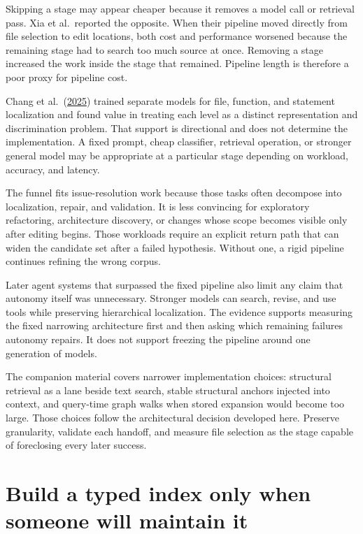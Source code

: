 Skipping a stage may appear cheaper because it removes a model call or retrieval pass. Xia et al.~reported the opposite. When their pipeline moved directly from file selection to edit locations, both cost and performance worsened because the remaining stage had to search too much source at once. Removing a stage increased the work inside the stage that remained. Pipeline length is therefore a poor proxy for pipeline cost.

Chang et al.~(\href{https://arxiv.org/abs/2502.15292}{2025}) trained separate models for file, function, and statement localization and found value in treating each level as a distinct representation and discrimination problem. That support is directional and does not determine the implementation. A fixed prompt, cheap classifier, retrieval operation, or stronger general model may be appropriate at a particular stage depending on workload, accuracy, and latency.

The funnel fits issue-resolution work because those tasks often decompose into localization, repair, and validation. It is less convincing for exploratory refactoring, architecture discovery, or changes whose scope becomes visible only after editing begins. Those workloads require an explicit return path that can widen the candidate set after a failed hypothesis. Without one, a rigid pipeline continues refining the wrong corpus.

Later agent systems that surpassed the fixed pipeline also limit any claim that autonomy itself was unnecessary. Stronger models can search, revise, and use tools while preserving hierarchical localization. The evidence supports measuring the fixed narrowing architecture first and then asking which remaining failures autonomy repairs. It does not support freezing the pipeline around one generation of models.

The companion material covers narrower implementation choices: structural retrieval as a lane beside text search, stable structural anchors injected into context, and query-time graph walks when stored expansion would become too large. Those choices follow the architectural decision developed here. Preserve granularity, validate each handoff, and measure file selection as the stage capable of foreclosing every later success.

\section{Build a typed index only when someone will maintain it}\label{build-a-typed-index-only-when-someone-will-maintain-it}

